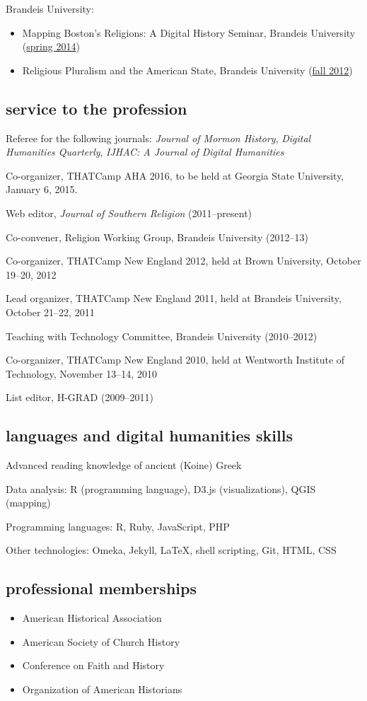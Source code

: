 \documentclass[11pt]{article}
\providecommand{\tightlist}{%
  \setlength{\itemsep}{0pt}\setlength{\parskip}{0pt}}
\begin{document}
Brandeis University:

\begin{itemize}
\tightlist
\item
  Mapping Boston's Religions: A Digital History Seminar, Brandeis
  University (\href{/downloads/pdf/religion-19c-dh.pdf}{spring 2014})
\item
  Religious Pluralism and the American State, Brandeis University
  (\href{/downloads/pdf/religious-pluralism.syllabus.2012-fall.pdf}{fall
  2012})
\end{itemize}

\subsection{service to the profession}\label{service}

Referee for the following journals: \emph{Journal of Mormon History}, 
\emph{Digital Humanities Quarterly}, \emph{IJHAC: A Journal of Digital 
  Humanities}

Co-organizer, THATCamp AHA 2016, to be held at Georgia State University,
January 6, 2015.

Web editor, \emph{Journal of Southern Religion} (2011--present)

Co-convener, Religion Working Group, Brandeis University (2012--13)

Co-organizer, THATCamp New England 2012, held at Brown University,
October 19--20, 2012

Lead organizer, THATCamp New England 2011, held at Brandeis University,
October 21--22, 2011

Teaching with Technology Committee, Brandeis University (2010--2012)

Co-organizer, THATCamp New England 2010, held at Wentworth Institute of
Technology, November 13--14, 2010

List editor, H-GRAD (2009--2011)

\subsection{languages and digital humanities
skills}\label{languages-and-digital-humanities-skills}

Advanced reading knowledge of ancient (Koine) Greek

Data analysis: R (programming language), D3.js (visualizations), QGIS
(mapping)

Programming languages: R, Ruby, JavaScript, PHP

Other technologies: Omeka, Jekyll, \LaTeX, shell scripting, Git, HTML,
CSS

\subsection{professional memberships}\label{professional-memberships}

\begin{itemize}
\item
  American Historical Association
\item
  American Society of Church History
\item
  Conference on Faith and History
\item
  Organization of American Historians
\end{itemize}
\end{document}

